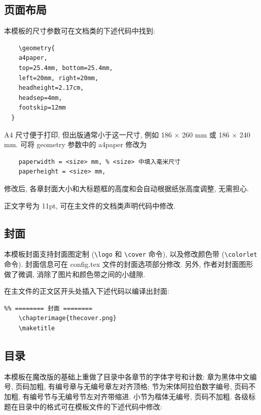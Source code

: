 \documentclass[../book.tex]{subfiles}
\begin{document}
    \subsection{页面布局}

本模板的尺寸参数可在文档类的下述代码中找到:

\begin{lstlisting}
    \geometry{
    a4paper,
    top=25.4mm, bottom=25.4mm,
    left=20mm, right=20mm,
    headheight=2.17cm,
    headsep=4mm,
    footskip=12mm
  }
\end{lstlisting}

A4 尺寸便于打印, 但出版通常小于这一尺寸, 例如 186 $\times$ 260 mm 或 186 $\times$ 240 mm. 可将 geometry 参数中的 a4paper 修改为
\begin{lstlisting}
    paperwidth = <size> mm, % <size> 中填入毫米尺寸
    paperheight = <size> mm,
\end{lstlisting}
修改后, 各章封面大小和大标题框的高度和会自动根据纸张高度调整, 无需担心.

正文字号为 11pt, 可在主文件的文档类声明代码中修改. 
    
    \subsection{封面}

本模板封面支持封面图定制 (\texttt{\textbackslash logo} 和 \texttt{\textbackslash cover} 命令), 以及修改颜色带 (\texttt{\textbackslash colorlet} 命令). 封面信息可在 config.tex 文件的封面选项部分修改. 另外, 作者对封面图形做了微调, 消除了图片和颜色带之间的小缝隙.

在主文件的正文区开头处插入下述代码以编译出封面:
\begin{lstlisting}
%% ======== 封面 ======== 
    \chapterimage{thecover.png}
    \maketitle
\end{lstlisting}

    \subsection{目录}

本模板在魔改版的基础上重做了目录中各章节的字体字号和计数: 章为黑体中文编号, 页码加粗, 有编号章与无编号章左对齐顶格; 节为宋体阿拉伯数字编号, 页码不加粗, 有编号节与无编号节左对齐带缩进. 小节为楷体无编号, 页码不加粗. 各级标题在目录中的格式可在模板文件的下述代码中修改:
\end{document}

